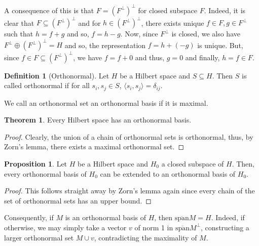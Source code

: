 \documentclass[
]{article}
\theoremstyle{definition}
\newtheorem{theorem}{Theorem}
\theoremstyle{definition}
\newtheorem{definition}{Definition}[section]
\newtheorem{proposition}{Proposition}[section]
\begin{document}
A consequence of this is that \(F = (F^\perp)^\perp\) for closed subspace \(F\). 
Indeed, it is clear that \(F \subseteq (F^\perp)^\perp\) and for 
\(h \in (F^\perp)^\perp\), there exists unique \(f \in F, g \in F^\perp\) such 
that \(h = f + g\) and so, \(f = h - g\). Now, since \(F^\perp\) is closed, we 
also have \(F^\perp \oplus (F^\perp)^\perp = H\) and so, the representation 
\(f = h + (-g)\) is unique. But, since \(f \in F \subseteq (F^\perp)^\perp\), 
we have \(f = f + 0\) and thus, \(g = 0\) and finally, \(h = f \in F\).

\begin{definition}[Orthonormal]
  Let \(H\) be a Hilbert space and \(S \subseteq H\). Then \(S\) is called 
  orthonormal if for all \(s_i, s_j \in S\), \(\langle s_i, s_j\rangle = \delta_{ij}\).

  We call an orthonormal set an orthonormal basis if it is maximal.
\end{definition}

\begin{theorem}
  Every Hilbert space has an orthonormal basis.
\end{theorem}
\begin{proof}
  Clearly, the union of a chain of orthonormal sets is orthonormal, thus, by 
  Zorn's lemma, there exists a maximal orthonormal set.
\end{proof}

\begin{proposition}
  Let \(H\) be a Hilbert space and \(H_0\) a closed subspace of \(H\). Then, every 
  orthonormal basis of \(H_0\) can be extended to an orthonormal basis of \(H_0\).
\end{proposition}
\begin{proof}
  This follows straight away by Zorn's lemma again since every chain of the set 
  of orthonormal sets has an upper bound.
\end{proof}

Consequently, if \(M\) is an orthonormal basis of \(H\), then 
\(\overline{\text{span}}M = H\). Indeed, if otherwise, we may simply take a 
vector \(v\) of norm 1 in \(\overline{\text{span}}M^\perp\), constructing a larger 
orthonormal set \(M \cup {v}\), contradicting the maximality of \(M\).
\end{document}
